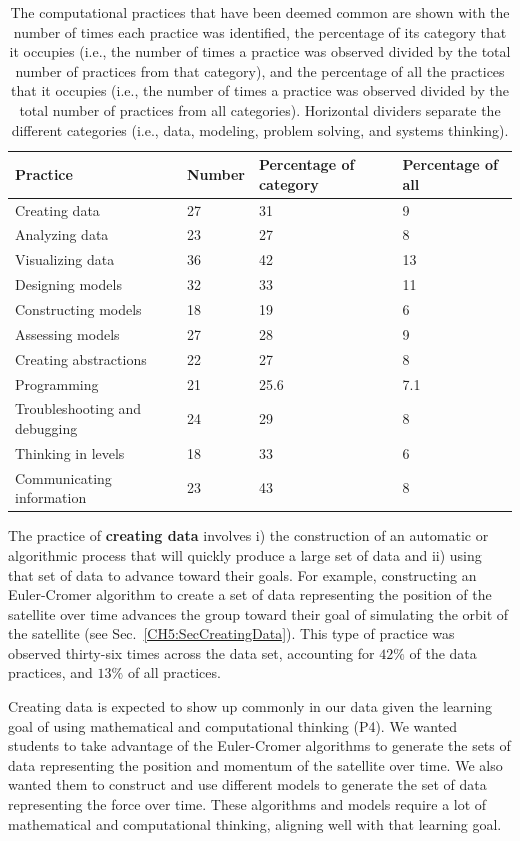 \documentclass{msuphddissertation}
\begin{document}
\begin{doublespace}
\begin{table}[hb]\centering
\begin{tabular}{llll}\hline\hline
Practice & Number & Percentage of category & Percentage of all\\\hline
Creating data & 27 & 31 & 9 \\
Analyzing data & 23 & 27 & 8 \\
Visualizing data & 36 & 42 & 13 \\\hline
Designing models & 32 & 33 & 11 \\
Constructing models & 18 & 19 & 6 \\
Assessing models & 27 & 28 & 9\\\hline
Creating abstractions & 22 & 27 & 8 \\
Programming & 21 & 25.6 & 7.1 \\
Troubleshooting and debugging & 24 & 29 & 8 \\\hline
Thinking in levels & 18 & 33 & 6 \\
Communicating information & 23 & 43 & 8 \\\hline\hline
\end{tabular}
\caption{The computational practices that have been deemed common are shown with the number of times each practice was identified, the percentage of its category that it occupies (i.e., the number of times a practice was observed divided by the total number of practices from that category), and the percentage of all the practices that it occupies (i.e., the number of times a practice was observed divided by the total number of practices from all categories).  Horizontal dividers separate the different categories (i.e., data, modeling, problem solving, and systems thinking).}\label{CH6:Common}
\end{table}

The practice of \textbf{creating data} involves i) the construction of an automatic or algorithmic process that will quickly produce a large set of data and ii) using that set of data to advance toward their goals.  For example, constructing an Euler-Cromer algorithm to create a set of data representing the position of the satellite over time advances the group toward their goal of simulating the orbit of the satellite (see Sec.~\ref{CH5:SecCreatingData}).  This type of practice was observed thirty-six times across the data set, accounting for $42\%$ of the data practices, and $13\%$ of all practices.

Creating data is expected to show up commonly in our data given the learning goal of using mathematical and computational thinking (P4).  We wanted students to take advantage of the Euler-Cromer algorithms to generate the sets of data representing the position and momentum of the satellite over time.  We also wanted them to construct and use different models to generate the set of data representing the force over time.  These algorithms and models require a lot of mathematical and computational thinking, aligning well with that learning goal.


\end{doublespace}
\end{document}
